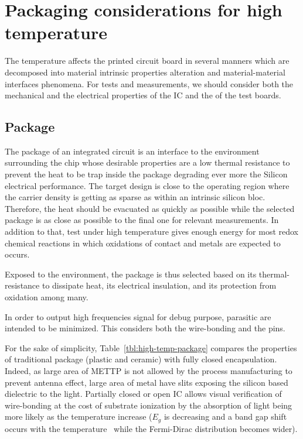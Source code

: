 
\chapter{Packaging considerations for high temperature}
\label{app:Packaging}

The temperature affects the printed circuit board in several manners which are decomposed into material intrinsic properties alteration and material-material interfaces phenomena. For tests and measurements, we should consider both the mechanical and the electrical properties of the IC and the of the test boards.

\section{Package}
The package of an integrated circuit is an interface to the environment surrounding the chip whose desirable properties are a low thermal resistance to prevent the heat to be trap inside the package degrading ever more the Silicon electrical performance. The target design is close to the operating region where the carrier density is getting as sparse as within an intrinsic silicon bloc.
Therefore, the heat should be evacuated as quickly as possible while the selected package is as close as possible to the final one for relevant measurements. In addition to that, test under high temperature gives enough energy for most redox chemical reactions in which oxidations of contact and metals are expected to occurs.

Exposed to the environment, the package is thus selected based on its thermal-resistance to dissipate heat, its electrical insulation, and its protection from oxidation among many.

In order to output high frequencies signal for debug purpose, parasitic are intended to be minimized. This considers both the wire-bonding and the pins.

For the sake of simplicity, Table~\ref{tbl:high-temp-package} compares the properties of traditional package (plastic and ceramic) with fully closed encapsulation. Indeed, as large area of METTP is not allowed by the process manufacturing to prevent antenna effect, large area of metal have slits exposing the silicon based dielectric to the light. Partially closed or open IC allows visual verification of wire-bonding at the cost of substrate ionization by the absorption of light being more likely as the temperature increase (\(E_g\) is decreasing and a band gap shift occurs with the temperature~\cite{Lautenschlager1985,Klenner1992} while the Fermi-Dirac distribution becomes wider).

